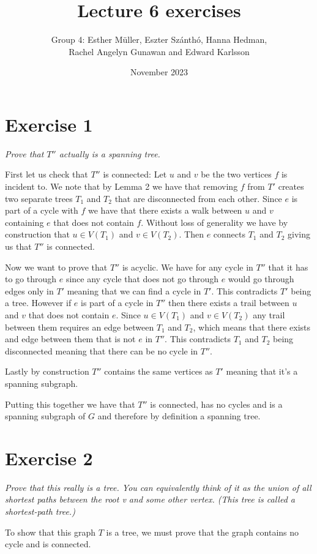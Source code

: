 \documentclass{article}
\title{Lecture 6 exercises}
\author{Group 4: Esther Müller, Eszter Szánthó, Hanna Hedman,\\ Rachel Angelyn Gunawan and Edward Karlsson}
\date{November 2023}
\begin{document}
\maketitle
\section*{Exercise 1}
\emph{Prove that $T''$ actually is a spanning tree.}
\vspace{0.4cm}
 
First let us check that $T''$ is connected: Let $u$ and $v$ be the two vertices $f$ is incident to. We note that by Lemma 2 we have that removing $f$ from $T'$ creates two separate trees $T_1$ and $T_2$ that are disconnected from each other. Since $e$ is part of a cycle with $f$ we have that there exists a walk between $u$ and $v$ containing $e$ that does not contain $f$. Without loss of generality we have by construction that $u \in V(T_1)$ and $v \in V(T_2)$. Then $e$ connects $T_1$ and $T_2$ giving us that $T''$ is connected.

Now we want to prove that $T''$ is acyclic. We have for any cycle in $T''$ that it has to go through $e$ since any cycle that does not go through $e$ would go through edges only in $T'$ meaning that we can find a cycle in $T'$. This contradicts $T'$ being a tree. However if $e$ is part of a cycle in $T''$ then there exists a trail between $u$ and $v$ that does not contain $e$. Since $u \in V(T_1)$ and $v \in V(T_2)$ any trail between them requires an edge between $T_1$ and $T_2$, which means that there exists and edge between them that is not $e$ in $T''$. This contradicts $T_1$ and $T_2$ being disconnected meaning that there can be no cycle in $T''$.

Lastly by construction $T''$ contains the same vertices as $T'$ meaning that it's a spanning subgraph.

Putting this together we have that $T''$ is connected, has no cycles and is a spanning subgraph of $G$ and therefore by definition a spanning tree.

\section*{Exercise 2}
\emph{Prove that this really is a tree. You can equivalently think of it as the union of all shortest paths between the root v and some other vertex. (This tree is called a shortest-path tree.)}
\vspace{0.4cm}

To show that this graph $T$ is a tree, we must prove that the graph contains no cycle and is connected.
\end{document}
